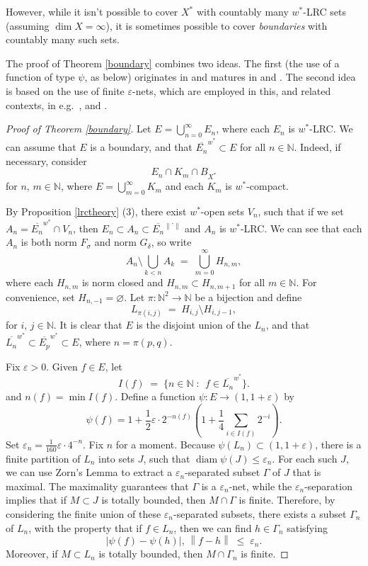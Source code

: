 \documentclass[12pt,a4paper]{amsart}
\theoremstyle{definition}
\theoremstyle{remark}
\DeclareMathOperator{\diam}{diam}
\newcommand{\cl}[1]{\ensuremath{\overline{{#1}}}}
\newcommand{\eps}{\ensuremath{\varepsilon}}
\newcommand{\n}[1]{\ensuremath{\left\|{#1}\right\|}}
\newcommand{\N}{\mathbb{N}}
\newcommand{\ndot}{\ensuremath{\left\|\cdot\right\|}}
\newcommand{\set}[2]{\{{#1} \;:\;\, {#2}\}}
\begin{document}
However, while it isn't possible to cover $X^*$ with countably many
$w^*$-LRC sets (assuming $\dim X  = \infty$), it is sometimes
possible to cover {\em boundaries} with countably many such sets.

The proof of Theorem \ref{boundary} combines two ideas. The first
(the use of a function of type $\psi$, as below)
originates in \cite[Theorem 5.1]{hh:07} and matures in \cite[Theorem
11]{FPST} and \cite[Lemma 3]{st:10}. The second idea is based on
the use of finite $\eps$-nets, which are employed in this, and
related contexts, in e.g.\ \cite[Theorem 24]{FPST}, \cite{fonf3} and
\cite{H1}.

\begin{proof}[Proof of Theorem \ref{boundary}]
Let $E = \bigcup_{n=0}^\infty E_n$, where each $E_n$ is $w^*$-LRC.
We can assume that $E$ is a boundary, and that $\cl{E_n}^{w^*}
\subset E$ for all $n \in \N$. Indeed, if necessary, consider
\[
E_n \cap K_m \cap B_{X^*}
\]
for $n,\, m \in \N$, where $E = \bigcup_{m=0}^\infty K_m$ and each
$K_m$ is $w^*$-compact.

By Proposition \ref{lrctheory} (3), there exist $w^*$-open sets $V_n$, such
that if we set $A_n = \cl{E_n}^{w^*} \cap V_n$, then $E_n
\subset A_n \subset \cl{E_n}^{\ndot}$ and $A_n$ is
$w^*$-LRC. We can see that each $A_n$ is both norm $F_\sigma$
and norm $G_\delta$, so write
\[
A_n\setminus\bigcup_{k<n} A_k \;=\; \bigcup_{m=0}^\infty H_{n,m},
\]
where each $H_{n,m}$ is norm closed and $H_{n,m}\subset H_{n,m+1}$
for all $m \in \N$. For convenience, set $H_{n,-1} = \varnothing$.
Let $\pi:\N^2 \to \N$ be a bijection and define
\[
L_{\pi(i,j)} \;=\; H_{i,j}\setminus H_{i,j-1},
\]
for $i,\, j \in \N$. It is clear that $E$ is the disjoint union of
the $L_n$, and that $\cl{L_n}^{w^*} \subset
\cl{E_p}^{w^*} \subset E$, where $n=\pi(p,q)$.

Fix $\eps>0$. Given $f \in E$, let
\[
I(f) \;=\; \set{n \in \N}{f \in \cl{L_n}^{w^*}}.
\]
and $n(f) = \min I(f)$. Define a function
$\psi:E \to (1,1+\eps)$ by
\[
\psi(f) = 1 + {\textstyle \frac{1}{2}}\eps\cdot 2^{-n(f)}\left(1 +
{\textstyle \frac{1}{4}}\sum_{i \in I(f)} 2^{-i} \right).
\]
Set $\eps_n = \frac{1}{160}\eps\cdot 4^{-n}$. Fix $n$ for a moment.
Because $\psi(L_n) \subset (1, 1+\eps)$, there is a finite partition
of $L_n$ into sets $J$, such that $\diam{\psi(J)} \leq \eps_n$. For
each such $J$, we can use Zorn's Lemma to extract a
$\eps_n$-separated subset $\Gamma$ of $J$ that is maximal. The
maximality guarantees that $\Gamma$ is a $\eps_n$-net, while the
$\eps_n$-separation implies that if $M \subset J$ is totally
bounded, then $M \cap \Gamma$ is finite. Therefore, by considering
the finite union of these $\eps_n$-separated subsets, there exists a
subset $\Gamma_n$ of $L_n$, with the property that if $f \in L_n$,
then we can find $h \in \Gamma_n$ satisfying
\begin{equation}\label{eqn1}
|\psi(f)-\psi(h)|,\, \n{f-h} \;\leq\; \eps_n.
\end{equation}
Moreover, if $M \subset L_n$ is totally bounded, then $M \cap
\Gamma_n$ is finite.


\end{proof}
\end{document}
